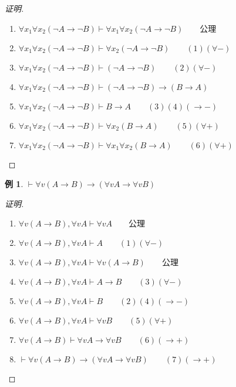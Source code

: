 \documentclass{article}
\newtheorem*{Example}{例}
\begin{document}
\begin{CJK*}{UTF8}{gbsn}
  \begin{proof}[证明]
    $\quad$

    \begin{enumerate}
      \item $\forall x_1 \forall x_2 (\lnot A\to \lnot B)\vdash \forall x_1 \forall x_2 (\lnot A\to \lnot B)\qquad\text{公理}$ 
      \item  $\forall x_1 \forall x_2 (\lnot A\to \lnot B)\vdash \forall x_2 (\lnot A\to \lnot B)\qquad (1)(\forall -)$
      \item $\forall x_1 \forall x_2 (\lnot A\to \lnot B)\vdash (\lnot A\to \lnot B)\qquad (2)(\forall -)$
      \item $\forall x_1 \forall x_2 (\lnot A\to \lnot B)\vdash (\lnot A\to \lnot B)\to (B\to A)$
      \item $\forall x_1 \forall x_2 (\lnot A\to \lnot B)\vdash B\to A\qquad (3)(4)(\to -)$
      \item $\forall x_1 \forall x_2 (\lnot A\to \lnot B)\vdash \forall x_2(B\to A)\qquad (5)(\forall +)$
      \item $\forall x_1 \forall x_2 (\lnot A\to \lnot B)\vdash \forall x_1\forall x_2(B\to A)\qquad (6)(\forall +)$
    \end{enumerate}
  \end{proof}

  \begin{Example}
    $\vdash \forall v(A\to B)\to (\forall v A\to \forall v B)$
  \end{Example}
  \begin{proof}[证明]

    $\qquad$

    \begin{enumerate}
      \item $\forall v(A\to B),\forall v A\vdash \forall v A \qquad \text{公理}$
      \item  $\forall v(A\to B),\forall v A\vdash A \qquad (1)(\forall -)$
      \item  $\forall v(A\to B),\forall v A\vdash \forall v (A\to B) \qquad \text{公理}$
      \item  $\forall v(A\to B),\forall v A\vdash A\to B \qquad (3)(\forall -)$
      \item  $\forall v(A\to B),\forall v A\vdash B \qquad (2)(4)(\to -)$
      \item $\forall v(A\to B),\forall v A\vdash \forall v B \qquad (5)(\forall +)$
      \item $\forall v(A\to B)\vdash \forall v A \to \forall v B \qquad (6)(\to +)$
      \item $\vdash \forall v(A\to B)\to (\forall v A\to \forall v B)\qquad (7)(\to +)$
    \end{enumerate}
  \end{proof}


\end{CJK*}
\end{document}
